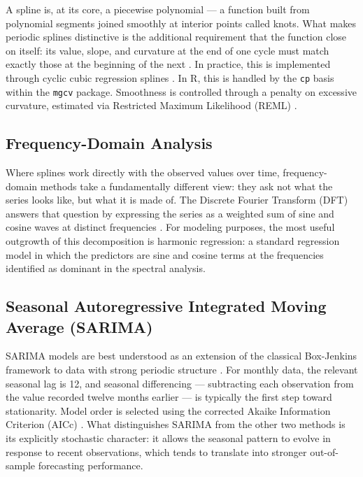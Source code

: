 \documentclass[10pt,twoside]{article}
\numberwithin{equation}{section}
\begin{document}
A spline is, at its core, a piecewise polynomial — a function built from polynomial segments joined smoothly at interior points called knots. What makes periodic splines distinctive is the additional requirement that the function close on itself: its value, slope, and curvature at the end of one cycle must match exactly those at the beginning of the next \cite{Wood2017}. In practice, this is implemented through cyclic cubic regression splines \cite{Kano2008}. In R, this is handled by the \texttt{cp} basis within the \texttt{mgcv} package. Smoothness is controlled through a penalty on excessive curvature, estimated via Restricted Maximum Likelihood (REML) \cite{Wood2017, Eilers1996}.



\subsection{Frequency-Domain Analysis}

Where splines work directly with the observed values over time, frequency-domain methods take a fundamentally different view: they ask not what the series looks like, but what it is made of. The Discrete Fourier Transform (DFT) answers that question by expressing the series as a weighted sum of sine and cosine waves at distinct frequencies \cite{Shumway2017, Bloomfield2000}. For modeling purposes, the most useful outgrowth of this decomposition is harmonic regression: a standard regression model in which the predictors are sine and cosine terms at the frequencies identified as dominant in the spectral analysis.



\subsection{Seasonal Autoregressive Integrated Moving Average (SARIMA)}

SARIMA models are best understood as an extension of the classical Box-Jenkins framework to data with strong periodic structure \cite{Box2015}. For monthly data, the relevant seasonal lag is 12, and seasonal differencing — subtracting each observation from the value recorded twelve months earlier — is typically the first step toward stationarity. Model order is selected using the corrected Akaike Information Criterion (AICc) \cite{Hyndman2021}. What distinguishes SARIMA from the other two methods is its explicitly stochastic character: it allows the seasonal pattern to evolve in response to recent observations, which tends to translate into stronger out-of-sample forecasting performance.
\end{document}
